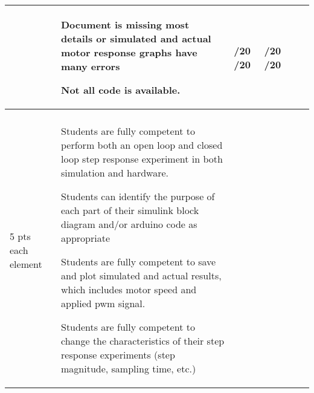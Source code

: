 \documentclass[11pt,landscape]{amsart}
\begin{document}
\begin{tabular}{llllcc}
&

\begin{minipage}{2.5in}\begin{list}{}{\leftmargin=1em}
\item Document is missing most details or simulated and actual motor response graphs have many errors
\item Not all code is available.
\end{list}
\end{minipage}
& \begin{minipage}{0.4in}\underline{\hspace{.25in}}/20  \underline{\hspace{.25in}}/20\end{minipage} 
& \begin{minipage}{0.4in}\underline{\hspace{.25in}}/20  \underline{\hspace{.25in}}/20\end{minipage} 
\\[2pt] \midrule

\begin{sideways}\hspace{-.35in}\begin{minipage}{.7in}\begin{center}\textbf{Demonstration} \\ 5 pts each element\end{center}\end{minipage}\end{sideways}  &


\begin{minipage}{2.5in}\begin{list}{}{\leftmargin=1em}
\item Students are fully competent to perform both an open loop and closed loop step response experiment in both simulation and hardware. 
\item Students can identify the purpose of each part of their simulink block diagram and/or arduino code as appropriate
\item Students are fully competent to save and plot simulated and actual results, which includes motor speed and applied pwm signal.
\item Students are fully competent to  change the characteristics of their step response experiments (step magnitude, sampling time, etc.) 
\end{list}
\end{minipage}
\vspace{.1in}
 &


\end{tabular}
\end{document}
